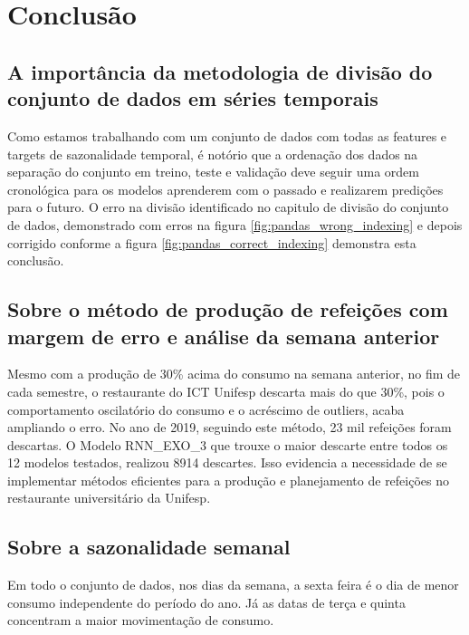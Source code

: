 \documentclass[	12pt, Times, openright, twoside, a4paper, english, brazil]{abntex2}
\begin{document}
  \chapter{Conclusão}
    \section{A importância da metodologia de divisão do conjunto de dados em séries temporais}
        Como estamos trabalhando com um conjunto de dados com todas as features e targets de sazonalidade temporal, é notório que a ordenação dos dados na separação do conjunto em treino, teste e validação deve seguir uma ordem cronológica para os modelos aprenderem com o passado e realizarem predições para o futuro. 
        O erro na divisão identificado no capitulo de divisão do conjunto de dados, demonstrado com erros na figura \ref{fig:pandas_wrong_indexing} e depois corrigido conforme a figura \ref{fig:pandas_correct_indexing} demonstra esta conclusão.

    \section{Sobre o método de produção de refeições com margem de erro e análise da semana anterior}
        Mesmo com a produção de 30\% acima do consumo na semana anterior, no fim de cada semestre, o restaurante do ICT Unifesp descarta mais do que 30\%, pois o comportamento oscilatório do consumo e o acréscimo de outliers, acaba ampliando o erro. No ano de 2019, seguindo este método, 23 mil refeições foram descartas.
        O Modelo RNN\_EXO\_3 que trouxe o maior descarte entre todos os 12 modelos testados, realizou 8914 descartes.
        Isso evidencia a necessidade de se implementar métodos eficientes para a produção e planejamento de refeições no restaurante universitário da Unifesp.
    
    \section{Sobre a sazonalidade semanal}
        Em todo o conjunto de dados, nos dias da semana, a sexta feira é o dia de menor consumo independente do período do ano. Já as datas de terça e quinta concentram a maior movimentação de consumo.
    
\end{document}
